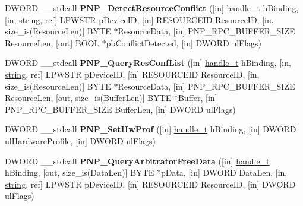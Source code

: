 \begin{DoxyCompactItemize}
D\+W\+O\+RD \+\_\+\+\_\+stdcall {\bfseries P\+N\+P\+\_\+\+Detect\+Resource\+Conflict} (\mbox{[}in\mbox{]} \hyperlink{interfacevoid}{handle\+\_\+t} h\+Binding, \mbox{[}in, \hyperlink{structstring}{string}, ref\mbox{]} L\+P\+W\+S\+TR p\+Device\+ID, \mbox{[}in\mbox{]} R\+E\+S\+O\+U\+R\+C\+E\+ID Resource\+ID, \mbox{[}in, size\+\_\+is(Resource\+Len)\mbox{]} B\+Y\+TE $\ast$Resource\+Data, \mbox{[}in\mbox{]} P\+N\+P\+\_\+\+R\+P\+C\+\_\+\+B\+U\+F\+F\+E\+R\+\_\+\+S\+I\+ZE Resource\+Len, \mbox{[}out\mbox{]} B\+O\+OL $\ast$pb\+Conflict\+Detected, \mbox{[}in\mbox{]} D\+W\+O\+RD ul\+Flags)
\item 
\mbox{\label{interfacepnp_ad681d31ac6cefa0becf750644269f5a3}} 
D\+W\+O\+RD \+\_\+\+\_\+stdcall {\bfseries P\+N\+P\+\_\+\+Query\+Res\+Conf\+List} (\mbox{[}in\mbox{]} \hyperlink{interfacevoid}{handle\+\_\+t} h\+Binding, \mbox{[}in, \hyperlink{structstring}{string}, ref\mbox{]} L\+P\+W\+S\+TR p\+Device\+ID, \mbox{[}in\mbox{]} R\+E\+S\+O\+U\+R\+C\+E\+ID Resource\+ID, \mbox{[}in, size\+\_\+is(Resource\+Len)\mbox{]} B\+Y\+TE $\ast$Resource\+Data, \mbox{[}in\mbox{]} P\+N\+P\+\_\+\+R\+P\+C\+\_\+\+B\+U\+F\+F\+E\+R\+\_\+\+S\+I\+ZE Resource\+Len, \mbox{[}out, size\+\_\+is(Buffer\+Len)\mbox{]} B\+Y\+TE $\ast$\hyperlink{class_buffer}{Buffer}, \mbox{[}in\mbox{]} P\+N\+P\+\_\+\+R\+P\+C\+\_\+\+B\+U\+F\+F\+E\+R\+\_\+\+S\+I\+ZE Buffer\+Len, \mbox{[}in\mbox{]} D\+W\+O\+RD ul\+Flags)
\item 
\mbox{\label{interfacepnp_a87bf014a815f0cd4cc6d5491a7220e93}} 
D\+W\+O\+RD \+\_\+\+\_\+stdcall {\bfseries P\+N\+P\+\_\+\+Set\+Hw\+Prof} (\mbox{[}in\mbox{]} \hyperlink{interfacevoid}{handle\+\_\+t} h\+Binding, \mbox{[}in\mbox{]} D\+W\+O\+RD ul\+Hardware\+Profile, \mbox{[}in\mbox{]} D\+W\+O\+RD ul\+Flags)
\item 
\mbox{\label{interfacepnp_ace3fc43f7984c41adba9c2c5de938fe3}} 
D\+W\+O\+RD \+\_\+\+\_\+stdcall {\bfseries P\+N\+P\+\_\+\+Query\+Arbitrator\+Free\+Data} (\mbox{[}in\mbox{]} \hyperlink{interfacevoid}{handle\+\_\+t} h\+Binding, \mbox{[}out, size\+\_\+is(Data\+Len)\mbox{]} B\+Y\+TE $\ast$p\+Data, \mbox{[}in\mbox{]} D\+W\+O\+RD Data\+Len, \mbox{[}in, \hyperlink{structstring}{string}, ref\mbox{]} L\+P\+W\+S\+TR p\+Device\+ID, \mbox{[}in\mbox{]} R\+E\+S\+O\+U\+R\+C\+E\+ID Resource\+ID, \mbox{[}in\mbox{]} D\+W\+O\+RD ul\+Flags)
\item 
\mbox{\label{interfacepnp_a145a8523958de58fac9425fad45fece6}} 

\end{DoxyCompactItemize}

